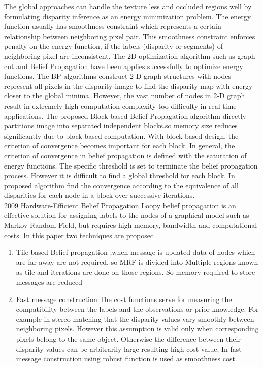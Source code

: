 The global approaches can handle the texture less and occluded regions well by formulating disparity inference as an energy minimization problem. The energy function usually has smoothness constraint which represents a certain relationship between neighboring pixel pair. This smoothness constraint enforces penalty on the energy function, if the labels (disparity or segments) of neighboring pixel are inconsistent.
The 2D optimization algorithm such as graph cut and Belief Propagation have been applies successfully to optimize energy functions. The BP algorithms construct 2-D graph structures with nodes represent all pixels in the disparity image to find the disparity map with energy closer to the global minima. However, the vast number of nodes in 2-D graph result in extremely high computation complexity too difficulty in real time applications.
The proposed Block based Belief Propagation algorithm directly partitions image into separated independent blocks.so memory size reduces significantly due to block based computation. With block based design, the criterion of convergence becomes important for each block. In general, the criterion of convergence in belief propagation is defined with the saturation of energy functions. The specific threshold is set to terminate the belief propagation process. However it is difficult to find a global threshold for each block. In proposed algorithm find the convergence according to the equivalence of all disparities for each node in a block over successive iterations.\\
2009 Hardware-Efficient Belief Propagation
Loopy belief propagation is an effective solution for assigning labels to the nodes of a graphical model such as Markov Random Field, but requires high memory, bandwidth and computational costs.
In this paper two techniques are proposed
\begin{enumerate}
  \item {Tile based Belief propagation ,when message is updated data of nodes which are far away are not required, so MRF is divided into
Multiple regions known as tile and iterations are done on those regions. So memory required to store messages are reduced}
  \item {Fast message construction:The cost functions serve for measuring the compatibility between the labels and the observations or prior knowledge.
For example in stereo matching that the disparity values vary smoothly between neighboring pixels. However this assumption is valid only when corresponding pixels belong to the same object. Otherwise the difference between their disparity values can be arbitrarily large resulting high cost value. In fast message construction using robust function is used as smoothness cost.}
\end{enumerate}
	


